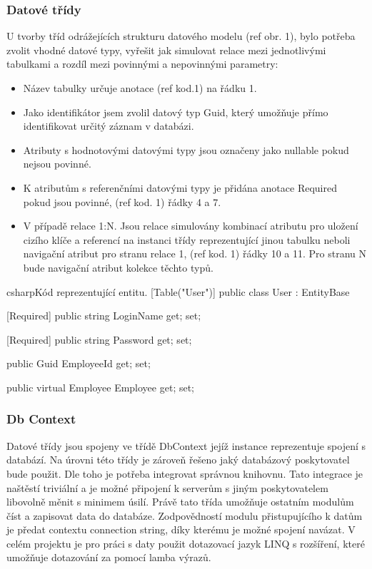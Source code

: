\documentclass[
  biblatex,
  glossaries,
  index
]{kidiplom}
\begin{document}
\subsubsection{Datové třídy}
 U tvorby tříd odrážejících strukturu datového modelu (ref obr. 1), bylo potřeba zvolit vhodné datové typy, vyřešit jak simulovat relace mezi jednotlivými tabulkami a rozdíl mezi povinnými a nepovinnými parametry:
\begin{itemize}
	\item Název tabulky určuje anotace (ref kod.1) na řádku 1. 
	\item Jako identifikátor jsem zvolil datový typ Guid, který umožňuje přímo identifikovat určitý záznam v databázi.
	\item Atributy s hodnotovými datovými typy jsou označeny jako nullable pokud nejsou povinné.
	\item K atributům s referenčními datovými typy je přidána anotace Required pokud jsou povinné, (ref kod. 1) řádky 4 a 7.
	\item V případě relace 1:N. Jsou relace simulovány kombinací atributu pro uložení cizího klíče a referencí na instanci třídy reprezentující jinou tabulku neboli navigační atribut pro stranu relace 1, (ref kod. 1) řádky 10 a 11. Pro stranu N bude navigační atribut kolekce těchto typů.
\end{itemize}

\begin{kicode}{csharp}{}{Kód reprezentující entitu.}
[Table("User")]
    public class User : EntityBase
    {
        [Required]
        public string LoginName { get; set; }

        [Required]
        public string Password { get; set; }

        public Guid EmployeeId { get; set; }

        public virtual Employee Employee { get; set; }
    }
\end{kicode}

\subsubsection{Db Context}
Datové třídy jsou spojeny ve třídě DbContext jejíž instance reprezentuje spojení s databází. Na úrovni této třídy je zároveň řešeno jaký databázový poskytovatel bude použit. Dle toho je potřeba integrovat správnou knihovnu. Tato integrace je naštěstí triviální a je možné připojení k serverům s jiným poskytovatelem libovolně měnit s minimem úsilí. Právě tato třída umožňuje ostatním modulům číst a zapisovat data do databáze. Zodpovědností modulu přistupujícího k datům je předat contextu connection string, díky kterému je možné spojení navázat. V celém projektu je pro práci s daty použit dotazovací jazyk LINQ s rozšíření, které umožňuje dotazování za pomocí lamba výrazů.
\end{document}
